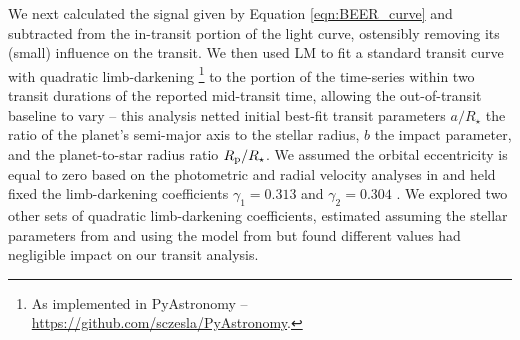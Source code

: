\documentclass[manuscript]{aastex62}
\begin{document}
We next calculated the signal given by Equation \ref{eqn:BEER_curve} and subtracted from the in-transit portion of the light curve, ostensibly removing its (small) influence on the transit. We then used LM to fit a standard transit curve with quadratic limb-darkening \citep{2002ApJ...580L.171M}\footnote{As implemented in PyAstronomy -- \url{https://github.com/sczesla/PyAstronomy}.} to the portion of the time-series within two transit durations of the reported mid-transit time, allowing the out-of-transit baseline to vary -- this analysis netted initial best-fit transit parameters $a/R_\star$ the ratio of the planet's semi-major axis to the stellar radius, $b$ the impact parameter, and the planet-to-star radius ratio $R_{\rm p}/R_\star$. We assumed the orbital eccentricity is equal to zero based on the photometric and radial velocity analyses in \citet{2013ApJ...771...26F} and held fixed the limb-darkening coefficients $\gamma_1 = 0.313$ and $\gamma_2 = 0.304$  \citep{2013ApJ...771...26F}. We explored two other sets of quadratic limb-darkening coefficients, estimated assuming the stellar parameters from \citet{2013ApJ...771...26F} and using the model from \citet{2015MNRAS.450.1879E} but found different values had negligible impact on our transit analysis.
\end{document}
